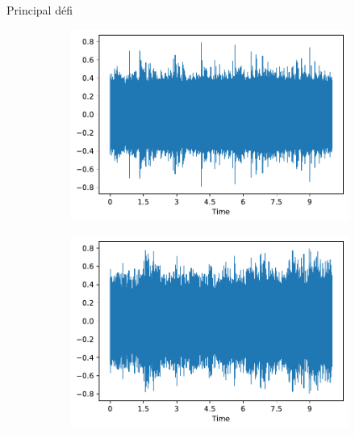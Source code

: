 \documentclass[compress,xcolor=table]{beamer}
\begin{document}
\begin{frame}{Principal défi}

    \begin{figure}[ht]
        \centering
        \begin{subfigure}[b]{0.45\textwidth}
            \centering
            \includegraphics[width=\textwidth]{images/audio/birds.wave.birdvox.pdf}
            \label{fig:birds.wave.birdvox}
        \end{subfigure}
        \hfill
        \begin{subfigure}[b]{0.45\textwidth}
            \centering
            \includegraphics[width=\textwidth]{images/audio/nobirds.wave.birdvox.pdf}
            \label{fig:nobirds.wave.birdvox}
        \end{subfigure}

        \vspace{-0.7cm}


\end{figure}
\end{frame}
\end{document}

